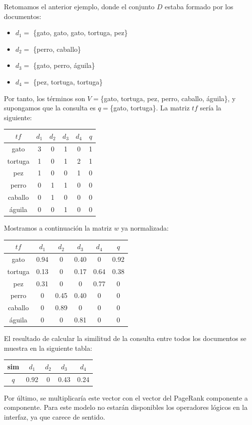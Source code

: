\documentclass[size=a4, parskip=half, titlepage=false, toc=flat, toc=bib, 12pt, twoside]{scrartcl}
\theoremstyle{theorem-style}
\theoremstyle{definition-style}
\theoremstyle{remark-style}
\theoremstyle{example-style}
\theoremstyle{definition-style}
\theoremstyle{remark-style}
\begin{document}
Retomamos el anterior ejemplo, donde el conjunto $D$ estaba formado por los documentos:
\begin{itemize}
\item $d_1 = $ \{gato, gato, gato, tortuga, pez\}
\item $d_2 = $ \{perro, caballo\}
\item $d_3 = $ \{gato, perro, águila\}
\item $d_4 = $ \{pez, tortuga, tortuga\}
\end{itemize}
Por tanto, los términos son $V=$\{gato, tortuga, pez, perro, caballo, águila\}, y supongamos que la consulta es $q =$\{gato, tortuga\}.
La matriz $tf$ sería la siguiente:
\begin{table}[H]
\centering
\begin{tabular}{|c|c|c|c|c|c|}
\hline
$tf$    & $d_1$ & $d_2$ & $d_3$ & $d_4$ & $q$ \\ \hline
gato    & 3     & 0     & 1     & 0     & 1   \\ \hline
tortuga & 1     & 0     & 1     & 2     & 1   \\ \hline
pez     & 1     & 0     & 0     & 1     & 0   \\ \hline
perro   & 0     & 1     & 1     & 0     & 0   \\ \hline
caballo & 0     & 1     & 0     & 0     & 0   \\ \hline
águila  & 0     & 0     & 1     & 0     & 0   \\ \hline
\end{tabular}
\end{table}
Mostramos a continuación la matriz $w$ ya normalizada:
\begin{table}[H]
\centering
\begin{tabular}{|c|c|c|c|c|c|}
\hline
$tf$    & $d_1$ & $d_2$ & $d_3$ & $d_4$ & $q$  \\ \hline
gato    & 0.94  & 0     & 0.40  & 0     & 0.92 \\ \hline
tortuga & 0.13  & 0     & 0.17  & 0.64  & 0.38 \\ \hline
pez     & 0.31  & 0     & 0     & 0.77  & 0    \\ \hline
perro   & 0     & 0.45  & 0.40  & 0     & 0    \\ \hline
caballo & 0     & 0.89  & 0     & 0     & 0    \\ \hline
águila  & 0     & 0     & 0.81  & 0     & 0    \\ \hline
\end{tabular}
\end{table}
El resultado de calcular la similitud de la consulta entre todos los documentos se muestra en la siguiente tabla:
\begin{table}[H]
\centering
\begin{tabular}{|c|c|c|c|c|}
\hline
sim & $d_1$ & $d_2$ & $d_3$ & $d_4$ \\ \hline
$q$ & 0.92  & 0     & 0.43  & 0.24  \\ \hline
\end{tabular}
\end{table}
Por último, se multiplicaría este vector con el vector del PageRank componente a componente. Para este modelo no estarán disponibles los operadores lógicos en la interfaz, ya que carece de sentido.
\end{document}

